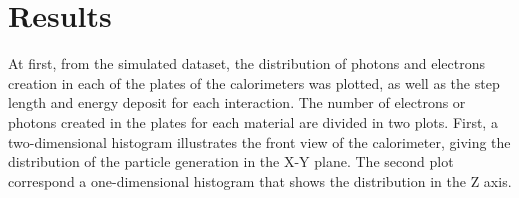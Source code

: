 \chapter{Results}

At first, from the simulated dataset, the distribution of photons and electrons
creation in each of the plates of the calorimeters was plotted, as well as the
step length and energy deposit for each interaction. The number of electrons or
photons created in the plates for each material are divided in two plots.
First, a two-dimensional histogram illustrates the front view of the
calorimeter, giving the distribution of the particle generation in the X-Y
plane. The second plot correspond a one-dimensional histogram that shows the
distribution in the Z axis.

\begin{figure}[htb!]
  \centering

  \hspace{1em}


\end{figure}

